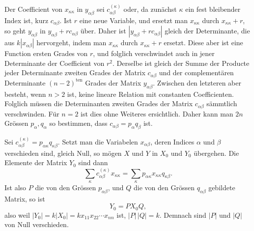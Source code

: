 \documentclass[11pt]{article}
\newcommand{\ten}{\mathrm{ten}}
\begin{document}
Der Coefficient von $x_{\kappa\kappa}$ in $y_{\alpha\beta}$ sei $c_{\alpha\beta}^{(\kappa)}$ oder, da zunächst $\kappa$ ein fest bleibender Index ist, kurz $c_{\alpha\beta}$. Ist $r$ eine neue Variable, und ersetzt man $x_{\kappa\kappa}$ durch $x_{\kappa\kappa}+r$, so geht $y_{\alpha\beta}$ in $y_{\alpha\beta}+rc_{\alpha\beta}$ über. Daher ist $|y_{\alpha\beta}+rc_{\alpha\beta}|$ gleich der Determinante, die aus $k|x_{\alpha\beta}|$ hervorgeht, indem man $x_{\kappa\kappa}$ durch $x_{\kappa\kappa}+r$ ersetzt. Diese aber ist eine Function ersten Grades von $r$, und folglich verschwindet auch in jener Determinante der Coefficient von $r^2$. Derselbe ist gleich der Summe der Producte jeder Determinante zweiten Grades der Matrix $c_{\alpha\beta}$ und der complementären Determinante $(n-2)^{\ten}$ Grades der Matrix $y_{\alpha\beta}$. Zwischen den letzteren aber besteht, wenn $n>2$ ist, keine lineare Relation mit constanten Coefficienten. Folglich müssen die Determinanten zweiten Grades der Matrix $c_{\alpha\beta}$ sämmtlich verschwinden. Für $n=2$ ist dies ohne Weiteres ersichtlich. Daher kann man $2n$ Grössen $p_{\alpha},q_{\alpha}$ so bestimmen, dass $c_{\alpha\beta}=p_\alpha q_\beta$ ist.

Sei $c_{\alpha\beta}^{(\kappa)}=p_{\alpha\kappa}q_{\kappa\beta}$. Setzt man die Variabelen $x_{\alpha\beta}$, deren Indices $\alpha$ und $\beta$ verschieden sind, gleich Null, so mögen $X$ und $Y$ in $X_0$ und $Y_0$ übergehen. Die Elemente der Matrix $Y_0$ sind dann
\[
\sum_\kappa c_{\alpha\beta}^{(\kappa)}x_{\kappa\kappa}=\sum_\kappa p_{\alpha\kappa}x_{\kappa\kappa}q_{\kappa\beta}.
\]
Ist also $P$ die von den Grössen $p_{\alpha\beta}$, und $Q$ die von den Grössen $q_{\alpha\beta}$ gebildete Matrix, so ist
\[
Y_0=PX_0Q,
\]
also weil $|Y_0|=k|X_0|=kx_{11}x_{22}\cdots x_{nn}$ ist, $|P|\,|Q|=k$. Demnach sind $|P|$ und $|Q|$ von Null verschieden.
\end{document}
